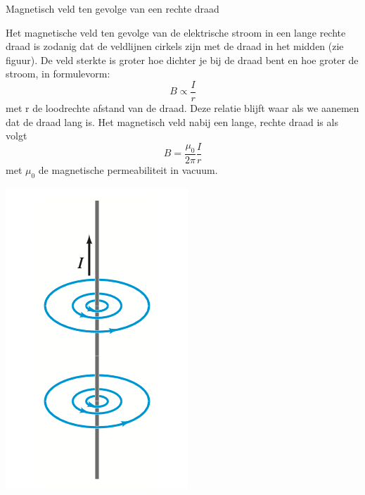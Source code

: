 \begin{app}{Magnetisch veld ten gevolge van een rechte draad}
    \begin{minipage}{0.87\textwidth}
        Het magnetische veld ten gevolge van de elektrische stroom in een lange rechte draad is zodanig dat de
        veldlijnen cirkels zijn met de draad in het midden (zie figuur). De veld sterkte is groter hoe dichter je bij de
        draad bent en hoe groter de stroom, in formulevorm:
        \begin{equation*}
            B \propto \dfrac{I}{r}
        \end{equation*}
        met r de loodrechte afstand van de draad. Deze relatie blijft waar als we aanemen dat de draad lang is.
        Het magnetisch veld nabij een lange, rechte draad is als volgt
        \begin{equation*}
            B = \dfrac{\mu_0}{2\pi}\dfrac{I}{r}
        \end{equation*}
        met $\mu_0$ de magnetische permeabiliteit in vacuum.
    \end{minipage}
    \begin{minipage}{.09\textwidth}
        \includegraphics[scale=0.225]{Images/Magnetisme/MagnetischVeldTenGevolgeRechteDraad}
    \end{minipage}
\end{app}

